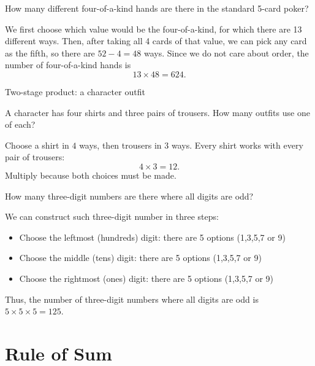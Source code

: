 \begin{frame}[t]
\begin{ex}
How many different four-of-a-kind hands are there in the standard 5-card poker?
\end{ex}
\begin{sol}
We first choose which value would be the four-of-a-kind, for which there are 13 different ways. Then, after taking all 4 cards of that value, we can pick any card as the fifth, so there are $52-4 = 48$ ways. Since we do not care about order, the number of four-of-a-kind hands is
\[ 13 \times 48 = 624.\]
\end{sol}
\end{frame}
\begin{frame}[t]{Two-stage product: a character outfit}
\small
\begin{ex}
A character has four shirts and three pairs of trousers. How many outfits use one of each?
\end{ex}
\begin{sol}
Choose a shirt in $4$ ways, then trousers in $3$ ways. Every shirt works with every pair of trousers:\[4\times3=12.\] Multiply because both choices must be made.
\end{sol}
\end{frame}



\begin{frame}[t]
\begin{ex}
How many three-digit numbers are there where all digits are odd?
\end{ex} \pa
\begin{sol}
We can construct such three-digit number in three steps: \pa
\begin{itemize}
\item Choose the leftmost (hundreds) digit: there are 5 options (1,3,5,7 or 9) \pa
\item Choose the middle (tens) digit: there are 5 options (1,3,5,7 or 9) \pa
\item Choose the rightmost (ones) digit: there are 5 options (1,3,5,7 or 9) \pa
\end{itemize}
Thus, the number of three-digit numbers where all digits are odd is $5 \times 5 \times 5 = 125$.
\end{sol}
\end{frame}


\section{Rule of Sum}
\frame{\sectionpage}

